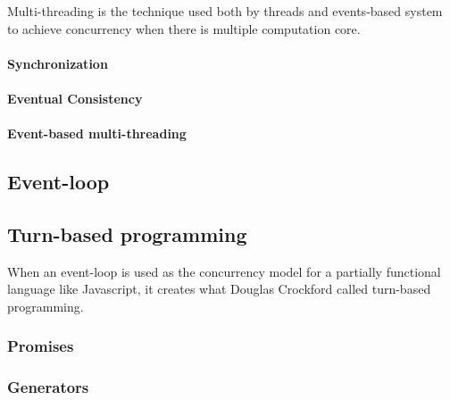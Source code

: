 Multi-threading is the technique used both by threads and events-based system to achieve concurrency when there is multiple computation core.

  \paragraph{Synchronization}

  \paragraph{Eventual Consistency}

  \paragraph{Event-based multi-threading}


\subsection{Event-loop}






\subsection{Turn-based programming}
When an event-loop is used as the concurrency model for a partially functional language like Javascript, it creates what Douglas Crockford called turn-based programming.


\subsubsection{Promises}




\subsubsection{Generators}

